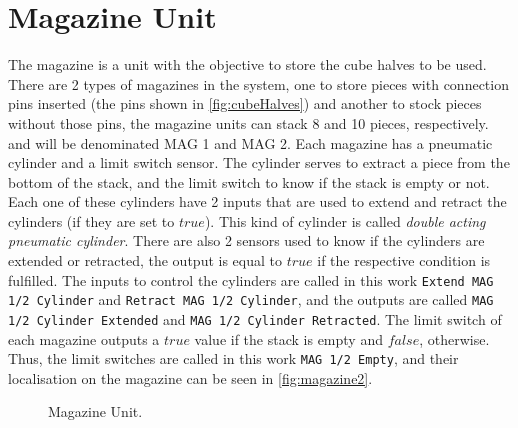 \section{Magazine Unit}
\label{sec:magazine}
The magazine is a unit with the objective to store the cube halves to be used.
There are 2 types of magazines in the system, one to
 store pieces with connection pins inserted (the pins shown in
 \autoref{fig:cubeHalves}) and another to stock pieces without those pins, the
 magazine units
 can stack 8 and 10 pieces, respectively. and will be denominated MAG 1 and MAG 2.
Each magazine has a pneumatic cylinder and a limit switch sensor. The cylinder serves to extract a
piece from the bottom of the stack, and the limit switch to know if the stack is empty
or not. Each one of these cylinders have 2 inputs that are used to extend and retract the cylinders (if they
are set to $true$). This kind of cylinder is called \emph{double acting
  pneumatic cylinder}. There are also 2
sensors used to know if the cylinders are extended or retracted, the output
is equal to $true$ if the respective condition is fulfilled. The inputs to
control the cylinders are called in this work \verb|Extend MAG 1/2 Cylinder| and
\verb|Retract MAG 1/2 Cylinder|, and the outputs are called \verb|MAG 1/2 Cylinder Extended| and
\verb|MAG 1/2 Cylinder Retracted|. The limit switch of each magazine outputs a $true$
value if the stack is empty and $false$, otherwise. Thus, the limit switches
are called in this work \verb|MAG 1/2 Empty|, and their localisation on the magazine
can be seen in \autoref{fig:magazine2}. 
\begin{figure}[H]
  \centering
  \caption{Magazine Unit.}
  \label{fig:magazine2}
\end{figure}

